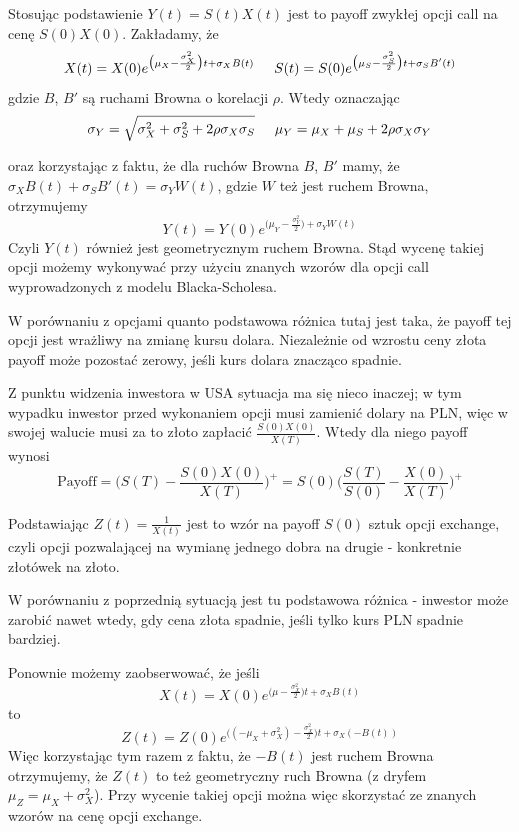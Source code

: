 \documentclass[12pt]{article}
\begin{document}
Stosując podstawienie $Y(t) = S(t)X(t)$ jest to payoff zwykłej opcji call na cenę $S(0)X(0)$. Zakładamy, że
\[
X(t) = X(0)e^{\big(\mu_X - \frac {\sigma_X^2} 2\big) t + \sigma_X B(t)} \hspace{5mm} S(t) = S(0)e^{\big(\mu_S - \frac {\sigma_S^2} 2\big) t + \sigma_S B'(t)} 
\]
gdzie $B$, $B'$ są ruchami Browna o korelacji $\rho$. Wtedy oznaczając \[
\sigma_Y = \sqrt{\sigma_X^2 + \sigma_S^2 + 2\rho \sigma_X \sigma_S} \hspace{5mm} \mu_Y = \mu_X + \mu_S + 2\rho \sigma_X \sigma_Y
\] 

oraz korzystając z faktu, że dla ruchów Browna $B$, $B'$ mamy, że $\sigma_X B(t) + \sigma_S B'(t) = \sigma_Y W(t)$, gdzie $W$ też jest ruchem Browna, otrzymujemy
\[
Y(t) = Y(0)e^{\big(\mu_Y - \frac {\sigma_Y^2} 2\big) + \sigma_Y W(t)}
\]
Czyli $Y(t)$ również jest geometrycznym ruchem Browna. Stąd wycenę takiej opcji możemy wykonywać przy użyciu znanych wzorów dla opcji call wyprowadzonych z modelu Blacka-Scholesa. 

W porównaniu z opcjami quanto podstawowa różnica tutaj jest taka, że payoff tej opcji jest wrażliwy na zmianę kursu dolara. Niezależnie od wzrostu ceny złota payoff może pozostać zerowy, jeśli kurs dolara znacząco spadnie.

Z punktu widzenia inwestora w USA sytuacja ma się nieco inaczej; w tym wypadku inwestor przed wykonaniem opcji musi zamienić dolary na PLN, więc w swojej walucie musi za to złoto zapłacić $\frac {S(0)X(0)} {X(T)}$. Wtedy dla niego payoff wynosi 
\[
\text{Payoff} = \Big( S(T) - \frac {S(0)X(0)} {X(T)}\Big)^+ = S(0) \Big( \frac {S(T)} {S(0)} - \frac {X(0)} {X(T)} \Big)^+
\]

Podstawiając $Z(t) = \frac 1 {X(t)}$ jest to wzór na  payoff $S(0)$ sztuk opcji exchange, czyli opcji pozwalającej na wymianę jednego dobra na drugie - konkretnie złotówek na złoto. 

W porównaniu z poprzednią sytuacją jest tu podstawowa różnica - inwestor może zarobić nawet wtedy, gdy cena złota spadnie, jeśli tylko kurs PLN spadnie bardziej.

Ponownie możemy zaobserwować, że jeśli 
\[
X(t) = X(0)e^{\big( \mu - \frac {\sigma_X^2} 2\big) t + \sigma_X B(t)}
\] 
to
\[
Z(t) = Z(0) e^{\big((-\mu_X + \sigma_X^2) - \frac {\sigma_X^2} 2\big) t + \sigma_X(-B(t))}
\]
Więc korzystając tym razem z faktu, że $-B(t)$ jest ruchem Browna otrzymujemy, że $Z(t)$ to też geometryczny ruch Browna (z dryfem $\mu_Z = \mu_X + \sigma_X^2$). Przy wycenie takiej opcji można więc skorzystać ze znanych wzorów na cenę opcji exchange. 
\end{document}
